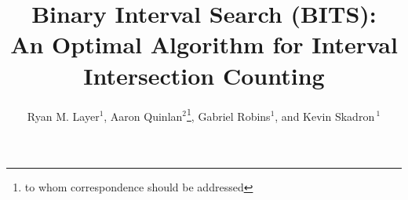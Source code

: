 \documentclass{bioinfo}
\begin{document}

	\title[Optimal Interval Intersection Counting]{
	Binary Interval Search (BITS):  \\
	An Optimal Algorithm for Interval Intersection Counting}

	\author[Sample \textit{et~al}]
	{Ryan M. Layer$^1$, 
	Aaron Quinlan$^2$\footnote{to whom correspondence should be addressed},
	Gabriel Robins$^1$, 
	and Kevin Skadron\,$^1$}
	\address{$^{1}$Department of Computer Science, University of Virginia,
	Charlottesville, VA\\
	$^{2}$Department of Public Health Sciences and Center for Public Health
	Genomics, Univeristy of Virginia, Charlottesville, VA}



	\maketitle
\end{document}
